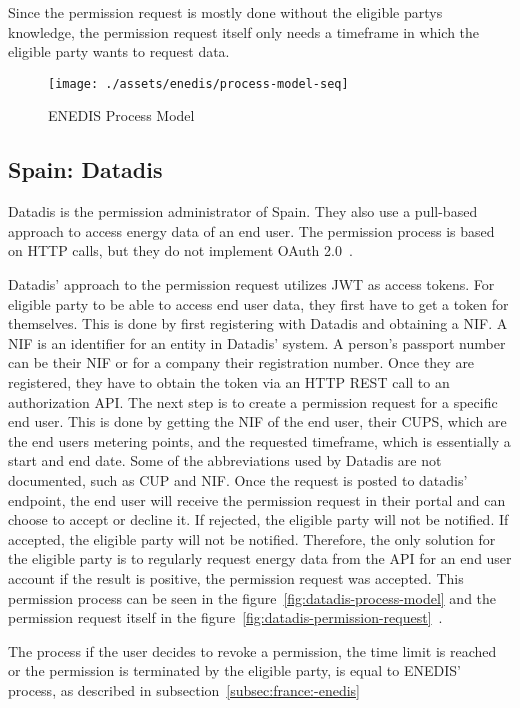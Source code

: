 Since the permission request is mostly done without the eligible partys knowledge, the permission request itself only needs a timeframe in which the eligible party wants to request data.

\begin{figure}[h]
    \texttt{[image: ./assets/enedis/process-model-seq]}
    \caption{ENEDIS Process Model}
    \label{fig:enedis-process-model}
\end{figure}

\subsection{Spain: Datadis}\label{subsec:spain:-datadis}
Datadis is the permission administrator of Spain.
They also use a pull-based approach to access energy data of an end user.
The permission process is based on HTTP calls, but they do not implement OAuth 2.0~\cite{datadis-dev-guide}.

Datadis' approach to the permission request utilizes JWT as access tokens.
For eligible party to be able to access end user data, they first have to get a token for themselves.
This is done by first registering with Datadis and obtaining a NIF.
A NIF is an identifier for an entity in Datadis' system.
A person's passport number can be their NIF or for a company their registration number.
Once they are registered, they have to obtain the token via an HTTP REST call to an authorization API.
The next step is to create a permission request for a specific end user.
This is done by getting the NIF of the end user, their CUPS, which are the end users metering points, and the requested timeframe, which is essentially a start and end date.
Some of the abbreviations used by Datadis are not documented, such as CUP and NIF.
Once the request is posted to datadis' endpoint, the end user will receive the permission request in their portal and can choose to accept or decline it.
If rejected, the eligible party will not be notified.
If accepted, the eligible party will not be notified.
Therefore, the only solution for the eligible party is to regularly request energy data from the API for an end user account if the result is positive, the permission request was accepted.
This permission process can be seen in the figure\ \ref{fig:datadis-process-model} and the permission request itself in the figure\ \ref{fig:datadis-permission-request}~\cite{datadis-dev-guide, bprt-issues}.

The process if the user decides to revoke a permission, the time limit is reached or the permission is terminated by the eligible party, is equal to ENEDIS' process, as described in subsection\ \ref{subsec:france:-enedis}

